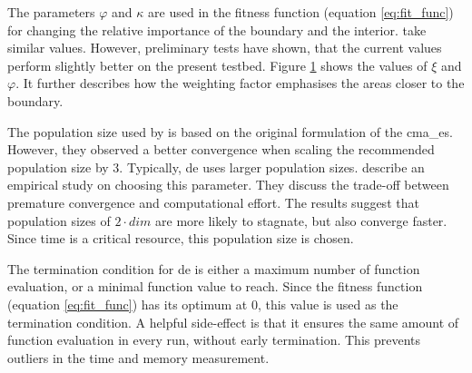 \documentclass[./\jobname.tex]{subfiles}
\begin{document}
The parameters $\varphi$ and $\kappa$ are used in the fitness function (equation \eqref{eq:fit_func}) for changing the relative importance of the boundary and the interior. \cite{chaquet_using_2019} take similar values. However, preliminary tests have shown, that the current values perform slightly better on the present testbed. Figure \ref{fig:collocation_weight} shows the values of $\xi$ and $\varphi$. It further describes how the weighting factor emphasises the areas closer to the boundary. 

\begin{figure}[h]
	\centering
	\noindent{}
	\label{fig:collocation_weight}
\end{figure}

The population size used by \cite{chaquet_using_2019} is based on the original formulation of the \gls{cma_es}. However, they observed a better convergence when scaling the recommended population size by 3. Typically, \gls{de} uses larger population sizes. \cite{mallipeddi_empirical_2008} describe an empirical study on choosing this parameter. They discuss the trade-off between premature convergence and computational effort. The results suggest that population sizes of $2\cdot dim$ are more likely to stagnate, but also converge faster. Since time is a critical resource, this population size is chosen. 

The termination condition for \gls{de} is either a maximum number of function evaluation, or a minimal function value to reach. Since the fitness function (equation \eqref{eq:fit_func}) has its optimum at 0, this value is used as the termination condition. A helpful side-effect is that it ensures the same amount of function evaluation in every run, without early termination. This prevents outliers in the time and memory measurement. 
\end{document}
